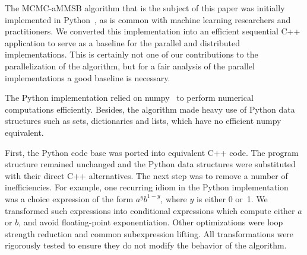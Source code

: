 The MCMC-aMMSB algorithm that is the subject of this paper was initially
implemented in Python~\cite{LiAW15}, as is common
with machine learning researchers and practitioners.
We converted this implementation into an efficient sequential C++ application
to serve as a baseline for the parallel and distributed implementations.
This is certainly not one of our contributions to the parallelization
of the algorithm, but for a fair analysis of the parallel implementations
a good baseline is necessary.

The Python implementation
relied on numpy~\cite{numpy} to perform numerical computations efficiently.
Besides, the algorithm
made heavy use of Python data structures such as sets, dictionaries and
lists, which have no efficient numpy equivalent.

First, the Python code base was ported into equivalent C++ code.
The program structure remained unchanged and the Python data structures were
substituted with their direct C++ alternatives.
%
The next step was to remove a number of inefficiencies.
For example, one recurring idiom in the Python implementation
was a choice expression of the form $a^y b^{1-y}$, where $y$ is either 0 or~1.
We transformed such expressions into conditional expressions which
compute either $a$ or $b$, and avoid floating-point exponentiation.
%
Other optimizations were loop strength
reduction and common subexpression lifting.
%
All transformations were rigorously tested to ensure they do
not modify the behavior of the algorithm.
%
\begin{comment}
Further, we replaced calls to the system's random
functions with a custom implementation of the random generator
\textit{xorshift\_128}~\cite{Marsaglia:2003:XR}. This way, random calls no longer
involve system calls, so we can support easy and fast multi-threaded random
calls by providing each thread with its private, differently seeded, random
generator.
\end{comment}
